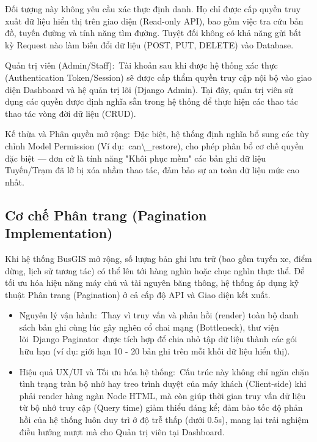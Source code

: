 \documentclass[13pt,a4paper]{report}
\begin{document}
Đối tượng này không yêu cầu xác thực định danh. Họ chỉ được cấp quyền truy xuất dữ liệu hiển thị trên giao diện (Read-only API), bao gồm việc tra cứu bản đồ, tuyến đường và tính năng tìm đường. Tuyệt đối không có khả năng gửi bất kỳ Request nào làm biến đổi dữ liệu (POST, PUT, DELETE) vào Database.

Quản trị viên (Admin/Staff): Tài khoản sau khi được hệ thống xác thực (Authentication Token/Session) sẽ được cấp thẩm quyền truy cập nội bộ vào giao diện Dashboard và hệ quản trị lõi (Django Admin). Tại đây, quản trị viên sử dụng các quyền được định nghĩa sẵn trong hệ thống để thực hiện các thao tác thao tác vòng đời dữ liệu (CRUD).

Kế thừa và Phân quyền mở rộng: Đặc biệt, hệ thống định nghĩa bổ sung các tùy chỉnh Model Permission (Ví dụ: can\textbackslash{}_restore), cho phép phân bổ cơ chế quyền đặc biệt — đơn cử là tính năng "Khôi phục mềm" các bản ghi dữ liệu Tuyến/Trạm đã lỡ bị xóa nhầm thao tác, đảm bảo sự an toàn dữ liệu mức cao nhất.

\subsection{Cơ chế Phân trang (Pagination Implementation)}

Khi hệ thống BusGIS mở rộng, số lượng bản ghi lưu trữ (bao gồm tuyến xe, điểm dừng, lịch sử tương tác) có thể lên tới hàng nghìn hoặc chục nghìn thực thể. Để tối ưu hóa hiệu năng máy chủ và tài nguyên băng thông, hệ thống áp dụng kỹ thuật Phân trang (Pagination) ở cả cấp độ API và Giao diện kết xuất.

\begin{itemize}
    \item Nguyên lý vận hành: Thay vì truy vấn và phản hồi (render) toàn bộ danh sách bản ghi cùng lúc gây nghẽn cổ chai mạng (Bottleneck), thư viện lõi Django Paginator được tích hợp để chia nhỏ tập dữ liệu thành các gói hữu hạn (ví dụ: giới hạn 10 - 20 bản ghi trên mỗi khối dữ liệu hiển thị).
    \item Hiệu quả UX/UI và Tối ưu hóa hệ thống: Cấu trúc này không chỉ ngăn chặn tình trạng tràn bộ nhớ hay treo trình duyệt của máy khách (Client-side) khi phải render hàng ngàn Node HTML, mà còn giúp thời gian truy vấn dữ liệu từ bộ nhớ truy cập (Query time) giảm thiểu đáng kể; đảm bảo tốc độ phản hồi của hệ thống luôn duy trì ở độ trễ thấp (dưới 0.5s), mang lại trải nghiệm điều hướng mượt mà cho Quản trị viên tại Dashboard.
\end{itemize}
\end{document}
